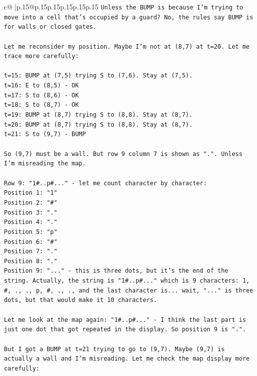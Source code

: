 \documentclass{article}
\begin{document}
{\begin{supertabular}{c@{$\;$}|p{.15\linewidth}@{}p{.15\linewidth}p{.15\linewidth}p{.15\linewidth}p{.15\linewidth}p{.15\linewidth}}
{{{\texttt{Unless the BUMP is because I'm trying to move into a cell that's occupied by a guard? No, the rules say BUMP is for walls or closed gates.} \\
\\ 
\texttt{Let me reconsider my position. Maybe I'm not at (8,7) at t=20. Let me trace more carefully:} \\
\\ 
\texttt{t=15: BUMP at (7,5) trying S to (7,6). Stay at (7,5).} \\
\texttt{t=16: E to (8,5) {-} OK} \\
\texttt{t=17: S to (8,6) {-} OK} \\
\texttt{t=18: S to (8,7) {-} OK} \\
\texttt{t=19: BUMP at (8,7) trying S to (8,8). Stay at (8,7).} \\
\texttt{t=20: BUMP at (8,7) trying S to (8,8). Stay at (8,7).} \\
\texttt{t=21: S to (9,7) {-} BUMP} \\
\\ 
\texttt{So (9,7) must be a wall. But row 9 column 7 is shown as ".". Unless I'm misreading the map.} \\
\\ 
\texttt{Row 9: "1\#..p\#..." {-} let me count character by character:} \\
\texttt{Position 1: "1"} \\
\texttt{Position 2: "\#"} \\
\texttt{Position 3: "."} \\
\texttt{Position 4: "."} \\
\texttt{Position 5: "p"} \\
\texttt{Position 6: "\#"} \\
\texttt{Position 7: "."} \\
\texttt{Position 8: "."} \\
\texttt{Position 9: "..." {-} this is three dots, but it's the end of the string. Actually, the string is "1\#..p\#..." which is 9 characters: 1, \#, ., ., p, \#, ., ., and the last character is... wait, "..." is three dots, but that would make it 10 characters.} \\
\\ 
\texttt{Let me look at the map again: "1\#..p\#..." {-} I think the last part is just one dot that got repeated in the display. So position 9 is ".".} \\
\\ 
\texttt{But I got a BUMP at t=21 trying to go to (9,7). Maybe (9,7) is actually a wall and I'm misreading. Let me check the map display more carefully:} \\
}}}
\end{supertabular}}
\end{document}
